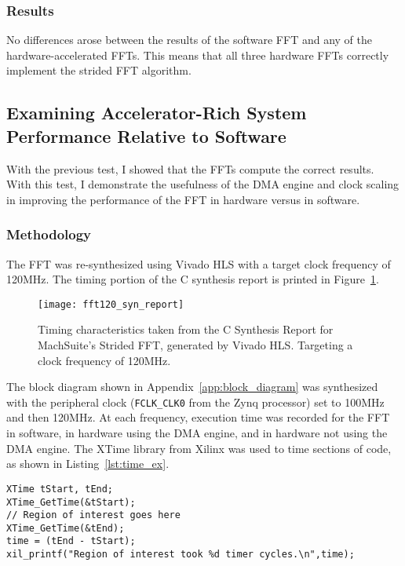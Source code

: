 \subsubsection{Results}
No differences arose between the results of the software FFT and any of the hardware-accelerated FFTs. This means that all three hardware FFTs correctly implement the strided FFT algorithm.

\subsection{Examining Accelerator-Rich System Performance Relative to Software}
With the previous test, I showed that the FFTs compute the correct results. With this test, I demonstrate the usefulness of the DMA engine and clock scaling in improving the performance of the FFT in hardware versus in software.

\subsubsection{Methodology}
The FFT was re-synthesized using Vivado HLS with a target clock frequency of 120MHz. The timing portion of the C synthesis report is printed in Figure~\ref{fig:120mhz_syn_report}.
\begin{figure}
\begin{center}
\texttt{[image: fft120\_syn\_report]}\\
\end{center}
\caption{Timing characteristics taken from the C Synthesis Report for MachSuite's Strided FFT, generated by Vivado HLS. Targeting a clock frequency of 120MHz.}
\label{fig:120mhz_syn_report}
\end{figure}
The block diagram shown in Appendix~\ref{app:block_diagram} was synthesized with the peripheral clock (\texttt{FCLK\_CLK0} from the Zynq processor) set to 100MHz and then 120MHz. At each frequency, execution time was recorded for the FFT in software, in hardware using the DMA engine, and in hardware not using the DMA engine. The XTime library from Xilinx was used to time sections of code, as shown in Listing~\ref{lst:time_ex}.

\begin{lstlisting}[caption={XTime example},label={lst:time_ex}]
XTime tStart, tEnd;
XTime_GetTime(&tStart);
// Region of interest goes here
XTime_GetTime(&tEnd);
time = (tEnd - tStart);
xil_printf("Region of interest took %d timer cycles.\n",time);
\end{lstlisting}

